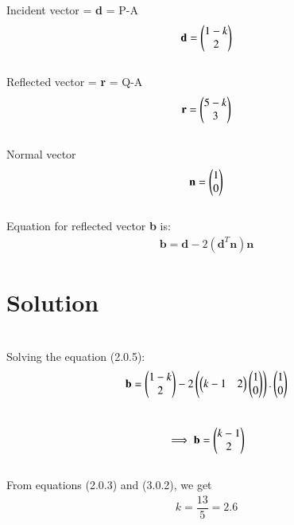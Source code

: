 \documentclass[journal,12pt,twocolumn]{IEEEtran}
\begin{document}
Incident vector = \textbf{d} = P-A
\begin{align}
    \textbf{d}=\begin{pmatrix}1-k \\ 2\end{pmatrix}
\end{align}
\\
Reflected vector = \textbf{r} = Q-A
\begin{align}
    \textbf{r}=\begin{pmatrix}5-k \\ 3\end{pmatrix}
\end{align}
\\
Normal vector
\begin{align}
    \textbf{n}=\begin{pmatrix}1\\0\end{pmatrix}
\end{align}
\\
Equation for reflected vector \textbf{b} is:\\
\begin{align}
    \textbf{b}=\textbf{d}-2(\textbf{d}^{T}\textbf{n})\textbf{n}
\end{align}

\section{Solution}
\\
Solving the equation (2.0.5):\\
\begin{align}
    \textbf{b}=\begin{pmatrix}1-k\\2\end{pmatrix}-2\left(\begin{pmatrix}k-1  & 2\end{pmatrix}\begin{pmatrix}1\\0\end{pmatrix}\right).\begin{pmatrix}1\\0\end{pmatrix}
\end{align}
\\ 
\begin{align}
    \implies \textbf{b}=\begin{pmatrix}k-1 \\ 2\end{pmatrix}
\end{align}
\\
From equations (2.0.3) and (3.0.2), we get
\begin{align}
    k=\dfrac{13}{5}=2.6
\end{align}
\end{document}
